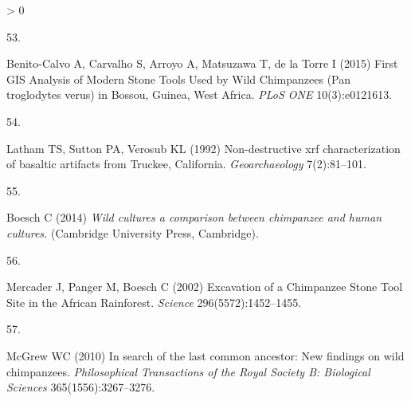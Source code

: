 \documentclass[9pt,twocolumn,twoside,]{pnas-new}
\newlength{\csllabelwidth}
\newlength{\cslhangindent}
\newenvironment{CSLReferences}[3] %
 {%
  \setlength{\parindent}{0pt}
  \ifodd #1 \everypar{\setlength{\hangindent}{\cslhangindent}}\ignorespaces\fi
  \ifnum #2 > 0
  \setlength{\parskip}{#2\baselineskip}
  \fi
 }%
 {}
\newcommand{\CSLLeftMargin}[1]{\parbox[t]{\csllabelwidth}{#1}}
\newcommand{\CSLRightInline}[1]{\parbox[t]{\linewidth - \csllabelwidth}{#1}}
\begin{document}
\begin{CSLReferences}{0}{0}
\leavevmode\hypertarget{ref-benito-calvoFirstGISAnalysis2015}{}%
\CSLLeftMargin{53. }
\CSLRightInline{Benito-Calvo A, Carvalho S, Arroyo A, Matsuzawa T, de la
Torre I (2015) First {GIS Analysis} of {Modern Stone Tools Used} by
{Wild Chimpanzees} ({Pan} troglodytes verus) in {Bossou}, {Guinea},
{West Africa}. \emph{PLoS ONE} 10(3):e0121613.}

\leavevmode\hypertarget{ref-lathamNondestructiveXrfCharacterization1992}{}%
\CSLLeftMargin{54. }
\CSLRightInline{Latham TS, Sutton PA, Verosub KL (1992) Non-destructive
xrf characterization of basaltic artifacts from {Truckee}, {California}.
\emph{Geoarchaeology} 7(2):81--101.}

\leavevmode\hypertarget{ref-boeschWildCulturesComparison2014}{}%
\CSLLeftMargin{55. }
\CSLRightInline{Boesch C (2014) \emph{Wild cultures a comparison between
chimpanzee and human cultures.} ({Cambridge University Press},
{Cambridge}).}

\leavevmode\hypertarget{ref-mercaderExcavationChimpanzeeStone2002}{}%
\CSLLeftMargin{56. }
\CSLRightInline{Mercader J, Panger M, Boesch C (2002) Excavation of a
{Chimpanzee Stone Tool Site} in the {African Rainforest}. \emph{Science}
296(5572):1452--1455.}

\leavevmode\hypertarget{ref-mcgrewSearchLastCommon2010}{}%
\CSLLeftMargin{57. }
\CSLRightInline{McGrew WC (2010) In search of the last common ancestor:
New findings on wild chimpanzees. \emph{Philosophical Transactions of
the Royal Society B: Biological Sciences} 365(1556):3267--3276.}

\end{CSLReferences}



% 
\end{document}
